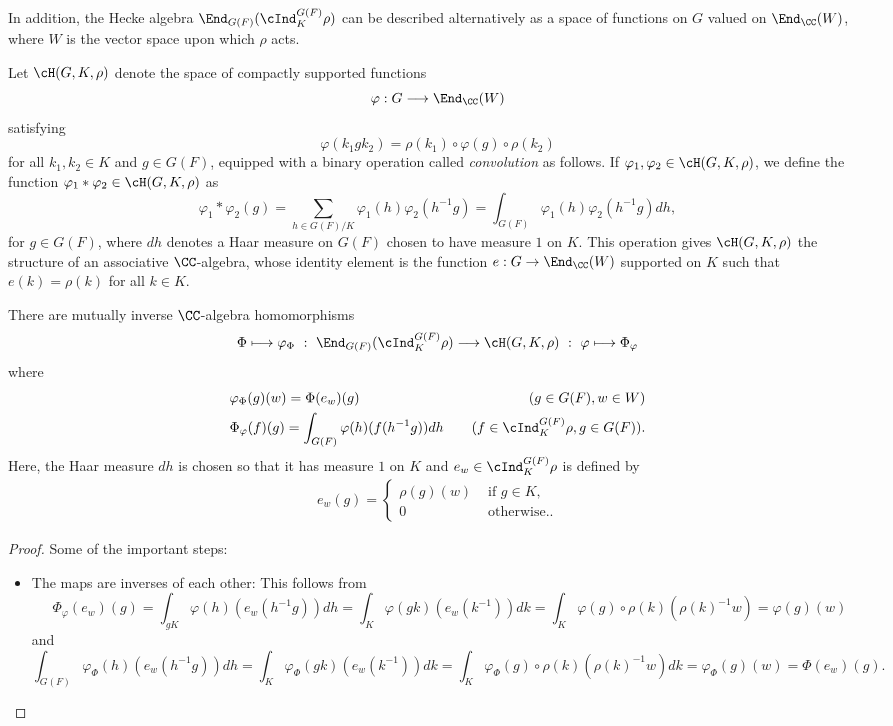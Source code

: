     In addition, the Hecke algebra $\End_{G(F)}(\cInd_K^{G(F)}\rho)$ can be described alternatively as a space of functions on $G$ valued on $\End_\CC(W)$, where $W$ is the vector space upon which $\rho$ acts.

    Let $\cH(G,K,\rho)$ denote the space of compactly supported functions $$\varphi:G\longrightarrow\End_\CC(W)$$
    satisfying
    $$\varphi(k_1 g k_2)=\rho(k_1)\circ\varphi(g)\circ\rho(k_2)$$
    for all $k_1,k_2\in K$ and $g\in G(F)$, equipped with a binary operation called \textit{convolution} as follows. If $\varphi_1,\varphi_2\in\cH(G,K,\rho)$, we define the function $\varphi_1*\varphi_2\in\cH(G,K,\rho)$ as
    $$\varphi_1*\varphi_2(g)=\sum_{h\in G(F)/K}\varphi_1(h)\varphi_2(h^{-1}g)=\int_{G(F)}\varphi_1(h)\varphi_2(h^{-1}g)dh,$$
    for $g\in G(F)$, where $dh$ denotes a Haar measure on $G(F)$ chosen to have measure $1$ on $K$. This operation gives $\cH(G,K,\rho)$ the structure of an associative $\CC$-algebra, whose identity element is the function $e:G\to\End_\CC(W)$ supported on $K$ such that $e(k)=\rho(k)$ for all $k\in K$.

    \begin{proposition}
        There are mutually inverse $\CC$-algebra homomorphisms
        \begin{equation}
            \Phi\longmapsto \varphi_\Phi\ :\ \End_{G(F)}(\cInd_K^{G(F)}\rho)\longrightarrow\cH(G,K,\rho)\ :\ \varphi \longmapsto \Phi_\varphi
        \end{equation}
        where
        \begin{align*}
            &\varphi_\Phi(g)(w)=\Phi(e_w)(g)\quad & (g\in G(F), w\in W)\\
            &\Phi_\varphi(f)(g)=\int_{G(F)}\varphi(h)(f(h^{-1}g))dh \quad &(f\in\cInd_K^{G(F)}\rho, g\in G(F)).
        \end{align*}
        Here, the Haar measure $dh$ is chosen so that it has measure $1$ on $K$ and $e_w\in\cInd_K^{G(F)}\rho$ is defined by
        \begin{align*}
            e_w(g)=
            \begin{cases}
                \rho(g)(w) &\text{ if } g\in K,\\
                0 &\text{ otherwise.}.
            \end{cases}
        \end{align*}        
    \end{proposition}
    \begin{proof}
        Some of the important steps:
        \begin{itemize}
            \item The maps are inverses of each other: This follows from 
            $$\Phi_\varphi(e_w)(g)=\int_{gK}\varphi(h)(e_w(h^{-1}g))dh=\int_K\varphi(gk)(e_w(k^{-1}))dk=\int_K\varphi(g)\circ\rho(k)(\rho(k)^{-1}w)=\varphi(g)(w)$$
            and 
            $$\int_{G(F)}\varphi_\Phi(h)(e_w(h^{-1}g))dh=\int_{K}\varphi_\Phi(gk)(e_w(k^{-1}))dk=\int_{K}\varphi_\Phi(g)\circ\rho(k)(\rho(k)^{-1}w)dk=\varphi_\Phi(g)(w)=\Phi(e_w)(g).$$
        \end{itemize}
    \end{proof}
